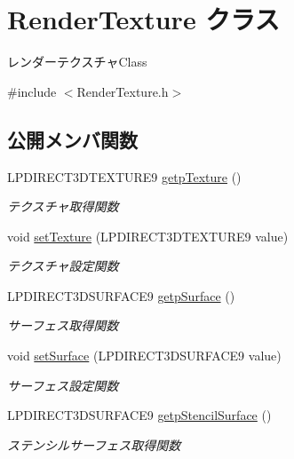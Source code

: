 \hypertarget{class_render_texture}{}\section{Render\+Texture クラス}
\label{class_render_texture}


レンダーテクスチャ\+Class  




{\ttfamily \#include $<$Render\+Texture.\+h$>$}

\subsection*{公開メンバ関数}
\begin{DoxyCompactItemize}
\item 
L\+P\+D\+I\+R\+E\+C\+T3\+D\+T\+E\+X\+T\+U\+R\+E9 \mbox{\hyperlink{class_render_texture_a8ba10b27c722fd529a09c0192fad3217}{getp\+Texture}} ()
\begin{DoxyCompactList}\small\item\em テクスチャ取得関数 \end{DoxyCompactList}\item 
void \mbox{\hyperlink{class_render_texture_a219709740e8a3ce6f28f457e28c54fab}{set\+Texture}} (L\+P\+D\+I\+R\+E\+C\+T3\+D\+T\+E\+X\+T\+U\+R\+E9 value)
\begin{DoxyCompactList}\small\item\em テクスチャ設定関数 \end{DoxyCompactList}\item 
L\+P\+D\+I\+R\+E\+C\+T3\+D\+S\+U\+R\+F\+A\+C\+E9 \mbox{\hyperlink{class_render_texture_aa616a3953ced62a67534748d24dbb00f}{getp\+Surface}} ()
\begin{DoxyCompactList}\small\item\em サーフェス取得関数 \end{DoxyCompactList}\item 
void \mbox{\hyperlink{class_render_texture_a8c9ea2c6a175191cf9dc356134e71944}{set\+Surface}} (L\+P\+D\+I\+R\+E\+C\+T3\+D\+S\+U\+R\+F\+A\+C\+E9 value)
\begin{DoxyCompactList}\small\item\em サーフェス設定関数 \end{DoxyCompactList}\item 
L\+P\+D\+I\+R\+E\+C\+T3\+D\+S\+U\+R\+F\+A\+C\+E9 \mbox{\hyperlink{class_render_texture_a8e858951717af1e9d47ca3a2d3f61263}{getp\+Stencil\+Surface}} ()
\begin{DoxyCompactList}\small\item\em ステンシルサーフェス取得関数 \end{DoxyCompactList}\item 

\end{DoxyCompactItemize}
